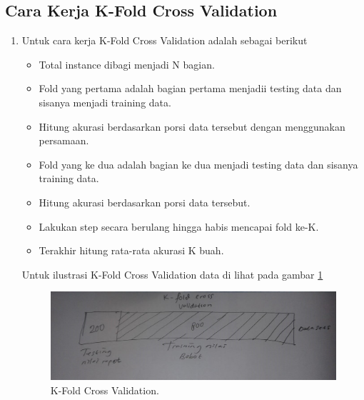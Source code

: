 \subsection{Cara Kerja K-Fold Cross Validation}
\begin{enumerate}
\item Untuk cara kerja K-Fold Cross Validation adalah sebagai berikut
	\begin{itemize}
		\item Total instance dibagi menjadi N bagian.
		\item Fold yang pertama adalah bagian pertama menjadii testing data dan sisanya menjadi training data.
		\item Hitung akurasi berdasarkan porsi data tersebut dengan menggunakan persamaan.
		\item Fold yang ke dua adalah bagian ke dua menjadi testing data dan sisanya training data. 
		\item Hitung akurasi berdasarkan porsi data tersebut.
		\item Lakukan step secara berulang hingga habis mencapai fold ke-K.
		\item Terakhir hitung rata-rata akurasi K buah.
	\end{itemize}

\subitem Untuk ilustrasi K-Fold Cross Validation data di lihat pada gambar \ref{5}
		\begin{figure}[ht]
		\centerline{\includegraphics[width=1\textwidth]{figures/AIP/5.JPEG}}
		\caption{K-Fold Cross Validation.}
		\label{5}
		\end{figure}
\end{enumerate}


